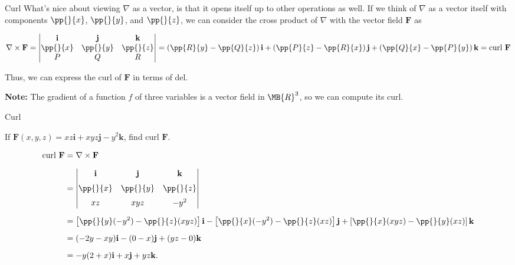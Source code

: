 \documentclass[11pt,english,
handout
]{beamer}
\begin{document}
\begin{frame}[t]{Curl}
\small
What's nice about viewing $\nabla$ as a vector, is that it opens itself up to other operations as well. \pause If we think of $\nabla$ as a vector itself with components $\pp{}{x}$, $\pp{}{y}$, and $\pp{}{z}$, we can consider the cross product of $\nabla$ with the vector field $\mathbf{F}$ as

{\footnotesize
\[
\nabla\times\mathbf{F}=\begin{vmatrix}\mathbf{i} & \mathbf{j} & \mathbf{k}\\\pp{}{x} & \pp{}{y} & \pp{}{z}\\ P & Q & R\end{vmatrix}=\left(\pp{R}{y}-\pp{Q}{z}\right)\mathbf{i}+\left(\pp{P}{z}-\pp{R}{x}\right)\mathbf{j}+\left(\pp{Q}{x}-\pp{P}{y}\right)\mathbf{k}=\text{curl }\mathbf{F}
\]
}

Thus, we can express the curl of $\mathbf{F}$ in terms of del.\pause 

\lspace 
\textbf{Note:} The gradient of a function $f$ of three variables is a vector field in $\MB{R}^3$, so we can compute its curl.
\end{frame}













\begin{frame}[t]{Curl}
\small

\begin{example}
If $\mathbf{F}(x,y,z)=xz\mathbf{i}+xyz\mathbf{j}-y^2\mathbf{k}$, find curl $\mathbf{F}$.\pause

\lspace
{\footnotesize
\begin{align*}
\text{curl }\mathbf{F}&=\nabla \times \mathbf{F}\\[2mm]
&=\begin{vmatrix}\mathbf{i} & \mathbf{j} & \mathbf{k}\\[2mm]\pp{}{x} & \pp{}{y} & \pp{}{z}\\[2mm] xz & xyz & -y^2\end{vmatrix}\\[2mm]
&=\left[\pp{}{y}(-y^2)-\pp{}{z}(xyz)\right]\mathbf{i}-\left[\pp{}{x}(-y^2)-\pp{}{z}(xz)\right]\mathbf{j}+\left[\pp{}{x}(xyz)-\pp{}{y}(xz)\right]\mathbf{k}\\[2mm]
&=(-2y-xy)\mathbf{i}-(0-x)\mathbf{j}+(yz-0)\mathbf{k}\\[2mm]
&=-y(2+x)\mathbf{i}+x\mathbf{j}+yz\mathbf{k}.
\end{align*}}
\end{example}


\end{frame}
\end{document}
